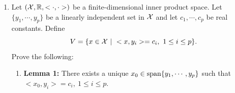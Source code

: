 \documentclass[letterpaper]{article}
\begin{document}
\begin{enumerate}
\begin{enumerate}
\item Run your Kalman filter using the data in \texttt{SegwayData4KF.mat}. Turn in the following plots:

 \begin{itemize}
\setlength{\itemsep}{.1in}

\item On one plot, $\widehat{\varphi}$ and $\widehat{\theta}$ versus time, $t$, or versus the time index $k$ (either is fine).

\item On a second  plot, $\widehat{\dot{\varphi}}$ and $\widehat{\dot{\theta}}$ versus time, $t$ or versus the time index $k$ (either is fine).

\item On a third  plot, the four components of your Kalman gain $K$ versus time, $t$, or versus the time index $k$ (either is fine).

    \textbf{Remark:} $t(k) = k T_s$, where $T_s$ is the sampling period.

\end{itemize}

\item You should see the components of your Kalman gain $K_k$ converging to constant values. Report these steady-state values. Then, execute the command below and compare $Kss$ to your steady-state value of $K$.
\begin{verbatim}
[Kss,Pss] = dlqe(A,G,C,R,Q)
\end{verbatim}
Using $K_{ss}$ in place of $K_k$ is called the steady-state Kalman filter. When the model matrices are time invariant, it is quite common to use the steady-state Kalman filter.

\end{enumerate}

\item   Let $({\cal X}, \mathbb R, <\cdot, \cdot>)$ be a finite-dimensional inner product space.  Let $\{y_1, \cdots, y_p \}$ be a linearly independent set in ${\cal X}$ and let $c_1, \cdots, c_p$ be real constants.  Define $$V=\{ x\in {\cal X}~|~ <x,y_i>=c_i,~1 \le i \le p\}. $$
    Prove the following:
  \begin{enumerate}
\setlength{\itemsep}{.1in}
\renewcommand{\labelenumi}{(\alph{enumi})}

\item  \textbf{Lemma 1:} There exists a unique $x_0 \in \textrm{span} \{ y_1, \cdots, y_p \}$ such that $<x_0,y_i>=c_i,~1 \le i \le p$.\\


\end{enumerate}
\end{enumerate}
\end{document}
